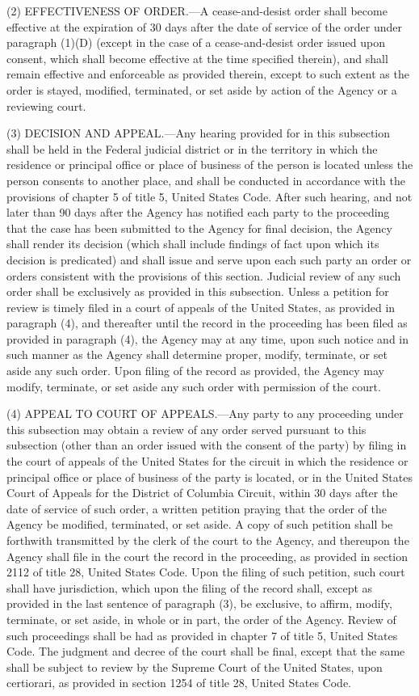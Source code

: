 (2) EFFECTIVENESS OF ORDER.—A cease-and-desist order shall become effective at the expiration of 30 days after the date of service of the order under paragraph (1)(D) (except in the case of a cease-and-desist order issued upon consent, which shall become effective at the time specified therein), and shall remain effective and enforceable as provided therein, except to such extent as the order is stayed, modified, terminated, or set aside by action of the Agency or a reviewing court.

(3) DECISION AND APPEAL.—Any hearing provided for in this subsection shall be held in the Federal judicial district or in the territory in which the residence or principal office or place of business of the person is located unless the person consents to another place, and shall be conducted in accordance with the provisions of chapter 5 of title 5, United States Code. After such hearing, and not later than 90 days after the Agency has notified each party to the proceeding that the case has been submitted to the Agency for final decision, the Agency shall render its decision (which shall include findings of fact upon which its decision is predicated) and shall issue and serve upon each such party an order or orders consistent with the provisions of this section. Judicial review of any such order shall be exclusively as provided in this subsection. Unless a petition for review is timely filed in a court of appeals of the United States, as provided in paragraph (4), and thereafter until the record in the proceeding has been filed as provided in paragraph (4), the Agency may at any time, upon such notice and in such manner as the Agency shall determine proper, modify, terminate, or set aside any such order. Upon filing of the record as provided, the Agency may modify, terminate, or set aside any such order with permission of the court.

(4) APPEAL TO COURT OF APPEALS.—Any party to any proceeding under this subsection may obtain a review of any order served pursuant to this subsection (other than an order issued with the consent of the party) by filing in the court of appeals of the United States for the circuit in which the residence or principal office or place of business of the party is located, or in the United States Court of Appeals for the District of Columbia Circuit, within 30 days after the date of service of such order, a written petition praying that the order of the Agency be modified, terminated, or set aside. A copy of such petition shall be forthwith transmitted by the clerk of the court to the Agency, and thereupon the Agency shall file in the court the record in the proceeding, as provided in section 2112 of title 28, United States Code. Upon the filing of such petition, such court shall have jurisdiction, which upon the filing of the record shall, except as provided in the last sentence of paragraph (3), be exclusive, to affirm, modify, terminate, or set aside, in whole or in part, the order of the Agency. Review of such proceedings shall be had as provided in chapter 7 of title 5, United States Code. The judgment and decree of the court shall be final, except that the same shall be subject to review by the Supreme Court of the United States, upon certiorari, as provided in section 1254 of title 28, United States Code.

